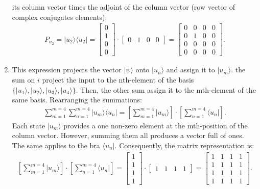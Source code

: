 \documentclass[letterpaper,11pt,twoside]{article}
\newcommand{\ket}[1]{|#1\rangle}
\newcommand{\bra}[1]{\langle#1|}
\begin{document}
\begin{enumerate}[itemsep=0pt,topsep=0pt,label=(\alph*)]
    its column vector times the adjoint of the column vector (row vector of complex conjugates elements):
    \begin{align*}
      P_{u_2}=\ket{u_2}\bra{u_2}=\begin{bmatrix}
        0\\1\\0\\0
      \end{bmatrix}\cdot\begin{bmatrix}
        0&1&0&0
      \end{bmatrix}=\begin{bmatrix}
        0&0&0&0\\
        0&1&0&0\\
        0&0&0&0\\
        0&0&0&0
      \end{bmatrix}.
    \end{align*}
    \item This expression projects the vector $\ket{\psi}$ onto $\ket{u_n}$ and assign it to $\ket{u_m}$. the sum on $i$ project the input to the nth-element of the basis
    $\{\ket{u_1},\ket{u_2},\ket{u_3},\ket{u_4}\}$. Then, the other sum assign it to the mth-element of the same basis.
    Rearranging the summations:
    \begin{align*}
      \sum_{m=1}^{m=4}\sum_{n=1}^{m=4}\ket{u_m}\bra{u_n}=\left[\sum_{m=1}^{m=4}\ket{u_m}\right]\cdot\left[\sum_{n=1}^{m=4}\bra{u_n}\right].
    \end{align*}
    Each state $\ket{u_m}$ provides a one non-zero element at the mth-position of the column vector. However, summing them all produces a vector full of ones.
    The same applies to the bra $\bra{u_n}$. Consequently, the matrix representation is:
    \begin{align*}
      \left[\sum_{m=1}^{m=4}\ket{u_m}\right]\cdot\left[\sum_{n=1}^{m=4}\bra{u_n}\right]=\begin{bmatrix}
        1\\1\\1\\1
      \end{bmatrix}\cdot\begin{bmatrix}
        1&1&1&1
      \end{bmatrix}=\begin{bmatrix}
        1&1&1&1\\
        1&1&1&1\\
        1&1&1&1\\
        1&1&1&1
      \end{bmatrix}.
    \end{align*}
  \end{enumerate}
%
\end{document}
